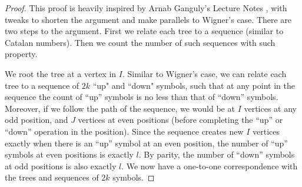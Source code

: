 \documentclass[11pt,openany]{article}
\begin{document}
\begin{proof}
    This proof is heavily inspired by Arnab Ganguly's Lecture Notes \cite{wiscnotes}, with tweaks to shorten the argument and make parallels to Wigner's case.
    There are two steps to the argument. First we relate each tree to a sequence (similar to Catalan numbers). Then we count the number of such sequences with such property.

    We root the tree at a vertex in $I$. Similar to Wigner's case, we can relate each tree to a sequence of $2k$ ``up" and ``down" symbols, such that at any point in the sequence the count of ``up'' symbols is no less than that of ``down'' symbols. Moreover, if we follow the path of the sequence, we would be at $I$ vertices at any odd position, and $J$ vertices at even positions (before completing the ``up'' or ``down'' operation in the position). Since the sequence creates new $I$ vertices exactly when there is an ``up'' symbol at an even position, the number of ``up'' symbols at even positions is exactly $l$. By parity, the number of ``down'' symbols at odd positions is also exactly $l$. We now have a one-to-one correspondence with the trees and sequences of $2k$ symbols.


\end{proof}
\end{document}
